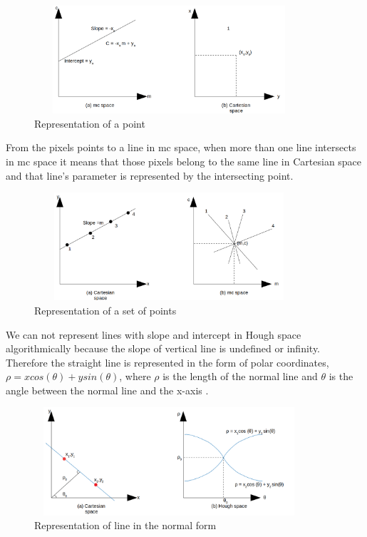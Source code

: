                     \begin{figure}[h]
    \centering
    \includegraphics[width=10cm, height =4cm]{images/hough2.png}
    \caption{Representation of a point}
    \end{figure}
    
    From the pixels points to a line in mc space, when more than one line intersects in mc space it means that those pixels belong to the same line in Cartesian space and that line's parameter is represented by the intersecting point. 
    
                 \begin{figure}[h]
    \centering
    \includegraphics[width=10cm, height =4cm]{images/hough3.png}
    \caption{Representation of a set of points}
    \end{figure}
    
    We can not represent lines with slope and intercept in Hough space algorithmically because the slope of vertical line is undefined or infinity. Therefore the straight line is represented in the form of polar coordinates, $\rho = xcos(\theta) + ysin(\theta) $, where $\rho$ is the length of the normal line and $\theta$ is the angle between the normal line and the x-axis \cite{hough1001} . 
    
    \begin{figure}[h]
    \centering
    \includegraphics[width=10cm, height =4cm]{images/hough4.png}
    \caption{Representation of line in the normal form}
    \end{figure}
    

